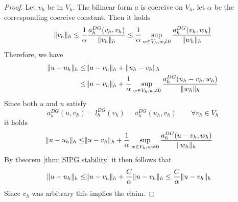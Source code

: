 \begin{proof}
	Let $v_h$ be in $V_h$.
	The bilinear form $a$ is coercive on $V_h$, let $\alpha$ be the corresponding coercive constant. 
	Then it holds
	\[
		\lVert v_h \rVert_{h} \leq \frac 1 \alpha \frac {a_h^{DG}(v_h, v_h)} {\lVert v_h \rVert_{h}} 
		 \leq \frac 1 \alpha \sup_{w \in V_h, w \neq 0} \frac {a_h^{DG}(v_h,w_h)} {\lVert w_h \rVert_{h}} 	
	\]
	Therefore, we have
	\begin{align*}
	\lVert u-u_h \rVert_{h} \leq& \lVert u-v_h \rVert_{h} + \lVert u_h-v_h \rVert_{h} \\
	\leq& \lVert u-v_h \rVert_{h} + \frac 1 \alpha \sup_{w \in V_h, w \neq 0} \frac {a_h^{DG}(u_h-v_h, w_h) }{\lVert w_h \rVert_{h}}
	\end{align*}
	Since both $u$ and $u$ satisfy
	\[
	a_h^{DG}(u,v_h) = l_h^{DG}(v_h) = a_h^{DG}(u_h,v_h) \qquad \forall v_h \in V_h
	\]
	it holds
	\begin{align*}
	\lVert u-u_h \rVert_{h} \leq& \lVert u-v_h \rVert_{h} + \frac 1 \alpha \sup_{w \in V_h, w \neq 0} \frac {a_h^{DG}(u-v_h, w_h) }{\lVert w_h \rVert_{h}}
	\end{align*}
	By theorem \ref{thm: SIPG stability} it then follows that
	\begin{align*}
	\lVert u-u_h \rVert_{h} \leq& \lVert u-v_h \rVert_{h} + \frac C \alpha \lVert u-v_h \rVert_{h} \leq \frac C \alpha \lVert u-v_h \rVert_{h}
	\end{align*}
	Since $v_h$ was arbitrary this implies the claim.
\end{proof}


